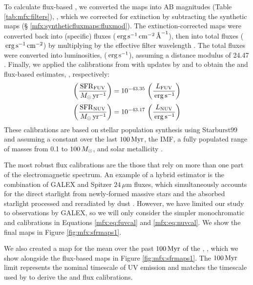 \documentclass[iop, tighten]{emulateapj}
\begin{document}
To calculate flux-based , we converted the \fxobs{} maps into AB
magnitudes (Table \ref{tab:mfx:filters}), \xobs{}, which we corrected for
extinction by subtracting the synthetic \ax{} maps (\S
\ref{mfx:syntheticfluxmaps:fluxmod}). The extinction-corrected maps were
converted back into (specific) fluxes ($\,\mathrm{erg} \,\mathrm{s}^{-1} \,\mathrm{cm}^{-2} \,\textrm{\AA}^{-1}$),
then into total fluxes ($\,\mathrm{erg} \,\mathrm{s}^{-1} \,\mathrm{cm}^{-2}$) by multiplying by the
effective filter wavelength \citep[$1538.6\ang$ for \fuv{}, $2315.7\ang$ for
\nuv{};][]{Morrissey:2007}. The total fluxes were converted into luminosities,
\lx{} ($\,\mathrm{erg} \,\mathrm{s}^{-1}$), assuming a distance modulus of 24.47
\citep{McConnachie:2005}. Finally, we applied the calibrations from
\citet{Kennicutt:1998} with updates by \citet{Hao:2011} and \citet{Murphy:2011}
\citep[see the review by][]{Kennicutt:2012} to obtain the \fuv{} and \nuv{}
flux-based \sfr{} estimates, \sfrx{}, respectively:
\begin{equation}
\left(\frac{\sfrfuv}{\msun\yr^{-1}}\right) =
    10^{-43.35}\,\left(\frac{\lfuv}{\erg\ssec^{-1}}\right)
\label{mfx:eq:fuvcal}
\end{equation}
\begin{equation}
\left(\frac{\sfrnuv}{\msun\yr^{-1}}\right) =
    10^{-43.17}\,\left(\frac{\lnuv}{\erg\ssec^{-1}}\right)
\label{mfx:eq:nuvcal}
\end{equation}
These calibrations are based on stellar population synthesis using Starburst99
\citep{Leitherer:1999} and assuming a constant \sfr{} over the last $100\,\mathrm{Myr}$,
the \citet{Kroupa:2001} IMF, a fully populated range of masses from 0.1 to
$100\,M_\odot$, and solar metallicity \citep{Hao:2011}.

The most robust flux calibrations are the those that rely on more than one part
of the electromagnetic spectrum. An example of a hybrid estimator is the
combination of GALEX \fuv{} and Spitzer $24\,\mu\mathrm{m}$ fluxes, which
simultaneously accounts for the direct starlight from newly-formed massive
stars and the absorbed starlight processed and reradiated by dust
\citep[e.g.,][]{Leroy:2012}. However, we have limited our study to observations
by GALEX, so we will only consider the simpler monochromatic \fuv{} and \nuv{}
calibrations in Equations \ref{mfx:eq:fuvcal} and \ref{mfx:eq:nuvcal}. We show
the final \sfrx{} maps in Figure \ref{fig:mfx:sfrmaps1}.

We also created a map for the mean \sfr{} over the past $100\,\mathrm{Myr}$ of the
, \sfroneh{}, which we show alongside the flux-based \sfr{} maps in
Figure \ref{fig:mfx:sfrmaps1}. The $100\,\mathrm{Myr}$ limit represents the nominal
timescale of UV emission and matches the timescale used by \citet{Hao:2011} to
derive the \fuv{} and \nuv{} flux calibrations.
\end{document}
